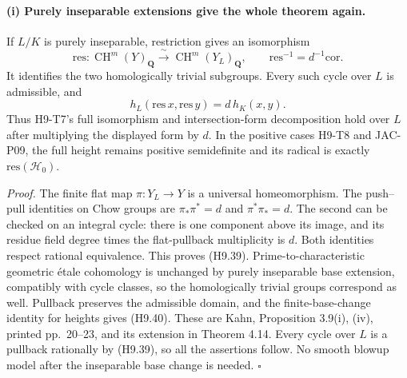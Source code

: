\documentclass[11pt,a4paper]{article}
\begin{document}
\paragraph{(i) Purely inseparable extensions give the whole theorem again.}
If $L/K$ is purely inseparable, restriction gives an isomorphism
\[
 \mathrm{res}:\operatorname{CH}^m(Y)_{\mathbf Q}
             \xrightarrow{\ \sim\ }
             \operatorname{CH}^m(Y_L)_{\mathbf Q},
 \qquad \mathrm{res}^{-1}=d^{-1}\mathrm{cor}.                \tag{H9.39}
\]
It identifies the two homologically trivial subgroups. Every such
cycle over $L$ is admissible, and
\[
 h_L(\mathrm{res}\,x,\mathrm{res}\,y)=d\,h_K(x,y).           \tag{H9.40}
\]
Thus H9-T7's full isomorphism and intersection-form decomposition hold
over $L$ after multiplying the displayed form by $d$. In the positive
cases H9-T8 and JAC-P09, the full height remains positive semidefinite
and its radical is exactly $\mathrm{res}(\mathcal H_0)$.

\emph{Proof.} The finite flat map $\pi:Y_L\to Y$ is a universal
homeomorphism. The push--pull identities on Chow groups are
$\pi_*\pi^*=d$ and $\pi^*\pi_*=d$. The second can be checked on an
integral cycle: there is one component above its image, and its residue
field degree times the flat-pullback multiplicity is $d$. Both
identities respect rational equivalence. This proves (H9.39).
Prime-to-characteristic geometric \'etale cohomology is unchanged by
purely inseparable base extension, compatibly with cycle classes, so
the homologically trivial groups correspond as well. Pullback preserves
the admissible domain, and the finite-base-change identity for heights
gives (H9.40). These are Kahn, Proposition 3.9(i), (iv), printed
pp.~20--23, and its extension in Theorem 4.14. Every cycle over $L$
is a pullback rationally by (H9.39), so all the assertions follow.
No smooth blowup model after the inseparable base change is needed.
\hfill$\square$
\end{document}
